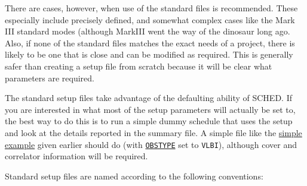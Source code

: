 \documentclass{report}
\newcommand{\sched}{{\sc SCHED}}
\begin{document}
There are cases, however, when use of the standard files is
recommended.  These especially include precisely defined, and somewhat
complex cases like the Mark III standard modes (although MarkIII went
the way of the dinosaur long ago.  Also, if none of the standard files
matches the exact needs of a project, there is likely to be one that
is close and can be modified as required.  This is generally safer
than creating a setup file from scratch because it will be clear what
parameters are required.

The standard setup files take advantage of the defaulting ability of
\sched.  If you are interested in what most of the setup parameters
will actually be set to, the best way to do this is to run a simple
dummy schedule that uses the setup and look at the details reported in
the summary file.  A simple file like the 
{\hyperref[SSEC:EXAMPLE3]{simple example}} given earlier should do (with 
{\hyperref[MP:OBSTYPE]{{\tt OBSTYPE}}}
set to {\tt VLBI}), although cover and correlator
information will be required.

Standard setup files are named according to the following
conventions:
\end{document}
